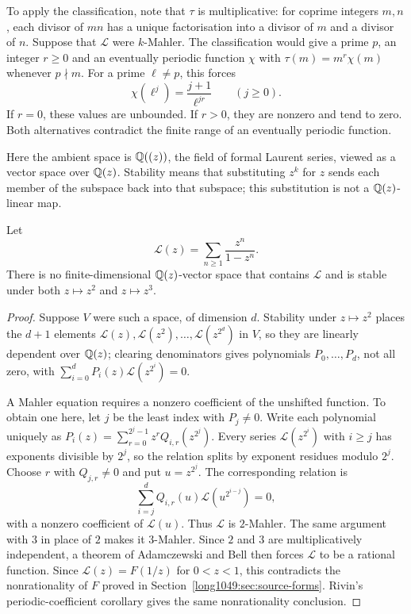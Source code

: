 \documentclass[11pt]{article}
\begin{document}
To apply the classification, note that $\tau$ is multiplicative:
for coprime integers $m,n$, each divisor of $mn$ has a unique
factorisation into a divisor of $m$ and a divisor of $n$.
Suppose that $\mathcal L$ were $k$-Mahler. The classification would give a prime $p$, an integer
$r\ge0$ and an eventually periodic function $\chi$ with
$\tau(m)=m^r\chi(m)$ whenever $p\nmid m$. For a prime $\ell\ne p$,
this forces
\[
 \chi(\ell^j)=\frac{j+1}{\ell^{jr}}\qquad(j\ge0).
\]
If $r=0$, these values are unbounded. If $r>0$, they are nonzero
and tend to zero. Both alternatives contradict the finite range of
an eventually periodic function.


Here the ambient space is $\mathbb{Q}((z))$, the field of formal Laurent
series, viewed as a vector space over $\mathbb{Q}(z)$. Stability means that
substituting $z^k$ for $z$ sends each member of the subspace back into
that subspace; this substitution is not a $\mathbb{Q}(z)$-linear map.

\begin{proposition}\label{long1049:res:nomahler}
Let
\[
 \mathcal L(z)=\sum_{n\ge1}\frac{z^n}{1-z^n}.
\]
There is no finite-dimensional $\mathbb{Q}(z)$-vector space that contains $\mathcal L$
and is stable under both $z\mapsto z^2$ and $z\mapsto z^3$.
\end{proposition}

\begin{proof}
Suppose $V$ were such a space, of dimension $d$.  Stability under $z\mapsto z^2$
places the $d+1$ elements $\mathcal L(z),\mathcal L(z^2),\dots,\mathcal
L(z^{2^{d}})$ in $V$, so they are linearly dependent over $\mathbb{Q}(z)$; clearing
denominators gives polynomials $P_0,\dots,P_d$, not all zero, with
$\sum_{i=0}^{d}P_i(z)\mathcal L(z^{2^i})=0$.

A Mahler equation requires a nonzero coefficient of the unshifted
function. To obtain one here, let $j$ be the least index with
$P_j\ne0$. Write each polynomial uniquely as
$P_i(z)=\sum_{r=0}^{2^j-1}z^rQ_{i,r}(z^{2^j})$.
Every series $\mathcal L(z^{2^i})$ with $i\ge j$ has exponents
divisible by $2^j$, so the relation splits by exponent residues modulo
$2^j$. Choose $r$ with $Q_{j,r}\ne0$ and put $u=z^{2^j}$. The
corresponding relation is
\[
 \sum_{i=j}^{d}Q_{i,r}(u)\mathcal L(u^{2^{i-j}})=0,
\]
with a nonzero coefficient of $\mathcal L(u)$. Thus $\mathcal L$ is
$2$-Mahler. The same argument with $3$ in place of $2$ makes it
$3$-Mahler. Since $2$ and
$3$ are multiplicatively independent, a theorem of Adamczewski and Bell
\cite[Thm.~1.1, p.~6]{adamczewskibell2013} then forces $\mathcal L$ to be a rational
function. Since $\mathcal L(z)=F(1/z)$ for $0<z<1$, this contradicts
the nonrationality of $F$ proved in Section~\ref{long1049:sec:source-forms}.
Rivin's periodic-coefficient corollary
\cite[Cor.~6.4, p.~9]{rivin2026} gives the same nonrationality conclusion.
\end{proof}
\end{document}

